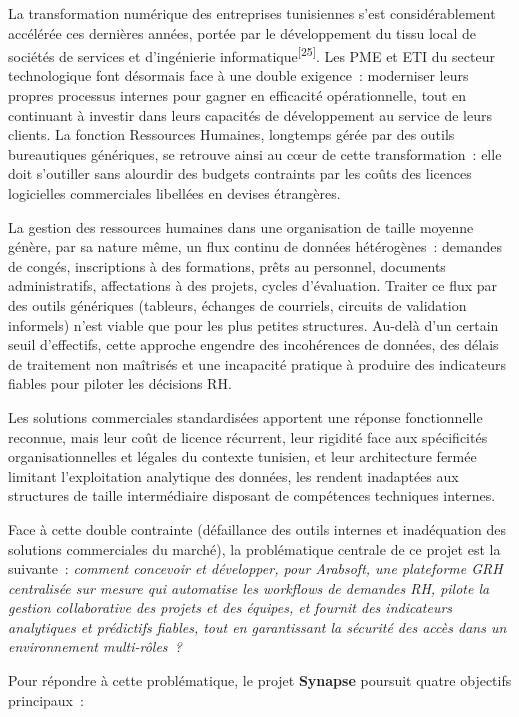 \documentclass[12pt,a4paper,oneside]{report}
\begin{document}
La transformation numérique des entreprises tunisiennes s'est considérablement
accélérée ces dernières années, portée par le développement du tissu local de
sociétés de services et d'ingénierie informatique\textsuperscript{[25]}. Les PME et ETI du secteur
technologique font désormais face à une double exigence~: moderniser leurs propres
processus internes pour gagner en efficacité opérationnelle, tout en continuant
à investir dans leurs capacités de développement au service de leurs clients. La
fonction Ressources Humaines, longtemps gérée par des outils bureautiques génériques,
se retrouve ainsi au cœur de cette transformation~: elle doit s'outiller sans
alourdir des budgets contraints par les coûts des licences logicielles commerciales
libellées en devises étrangères.

La gestion des ressources humaines dans une organisation de taille moyenne génère,
par sa nature même, un flux continu de données hétérogènes~: demandes de congés,
inscriptions à des formations, prêts au personnel, documents administratifs,
affectations à des projets, cycles d'évaluation. Traiter ce flux par des outils génériques (tableurs, échanges de courriels,
circuits de validation informels) n'est viable que pour les plus petites structures. Au-delà d'un certain seuil
d'effectifs, cette approche engendre des incohérences de données, des délais de
traitement non maîtrisés et une incapacité pratique à produire des indicateurs
fiables pour piloter les décisions RH.

Les solutions commerciales standardisées apportent une réponse fonctionnelle reconnue, mais leur coût de licence récurrent, leur rigidité face aux spécificités organisationnelles et légales du contexte tunisien, et leur architecture fermée limitant l'exploitation analytique des données, les rendent inadaptées aux structures de taille intermédiaire disposant de compétences techniques internes.

Face à cette double contrainte (défaillance des outils internes et inadéquation
des solutions commerciales du marché), la problématique centrale de ce projet
est la suivante~: \textit{comment concevoir et développer, pour Arabsoft, une
plateforme GRH centralisée sur mesure qui automatise les workflows de demandes RH,
pilote la gestion collaborative des projets et des équipes, et fournit des indicateurs
analytiques et prédictifs fiables, tout en garantissant la sécurité des accès dans
un environnement multi-rôles~?}

Pour répondre à cette problématique, le projet \textbf{Synapse} poursuit
quatre objectifs principaux~:
\end{document}
